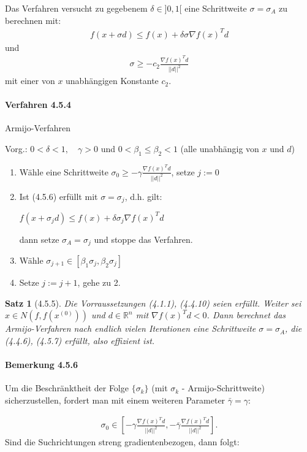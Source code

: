 \documentclass[ngerman,halfparskip]{scrartcl}
\newtheorem*{satz}{Satz}
\theoremstyle{definition}
\newcommand*{\R}{\mathbb{R}}      %
\begin{document}
Das Verfahren versucht zu gegebenem $\delta \in ]0,1[$ eine Schrittweite $\sigma=\sigma_A$ zu berechnen mit:
\begin{gather*}\tag{4.5.6}
f(x+\sigma d)\leq f(x)+\delta \sigma \nabla f(x)^Td
\end{gather*}
und 
\begin{gather*}\tag{4.5.7}
\sigma \geq -c_2\frac{\nabla f(x)^Td}{||d||^2}
\end{gather*}
mit einer von $x$ unabhängigen Konstante $c_2$.

\paragraph{Verfahren 4.5.4} Armijo-Verfahren

Vorg.: $0<\delta <1, \quad \gamma>0$ und $0<\beta_1\leq \beta _2<1$ (alle unabhängig von $x$ und $d$)
\begin{enumerate}
\item Wähle eine Schrittweite $\sigma_0\geq -\gamma \frac{\nabla f(x)^Td}{||d||^2}$, setze $j:=0$
\item Ist (4.5.6) erfüllt mit $\sigma=\sigma_j$, d.h. gilt:

$f(x+\sigma_j d)\leq f(x)+\delta\sigma_j \nabla f(x)^Td$

dann setze $\sigma_A=\sigma_j$ und stoppe das Verfahren.
\item Wähle $\sigma_{j+1}\in [\beta_1\sigma_j,\beta_2\sigma_j]$
\item Setze $j:=j+1$, gehe zu 2.
\end{enumerate}

\begin{satz}[4.5.5]
Die Vorraussetzungen (4.1.1), (4.4.10) seien erfüllt. Weiter sei $x\in N(f,f(x^{(0)}))$ und $d\in\R^n$ mit $\nabla f(x)^Td<0$. Dann berechnet das Armijo-Verfahren nach endlich vielen Iterationen eine Schrittweite $\sigma=\sigma_A$, die (4.4.6), (4.5.7) erfüllt, also effizient ist.
\end{satz}

\paragraph{Bemerkung 4.5.6} Um die Beschränktheit der Folge $\{\sigma_k\}$ (mit $\sigma_k$ - Armijo-Schrittweite) sicherzustellen, fordert man mit einem weiteren Parameter $\bar\gamma=\gamma$:

\begin{gather*}\tag{4.5.8}
\sigma_0\in\left [ -\gamma \frac {\nabla f(x)^Td}{||d||^2},-\bar \gamma \frac {\nabla f(x)^Td}{||d||^2}\right ].
\end{gather*}
Sind die Suchrichtungen streng gradientenbezogen, dann folgt:
\end{document}
